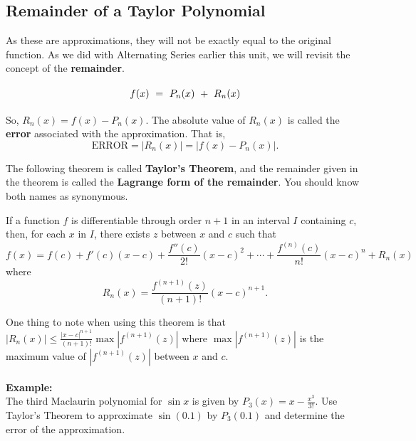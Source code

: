\subsection*{Remainder of a Taylor Polynomial}
As these are approximations, they will not be exactly equal to the original function. As we did with Alternating Series earlier this unit, we will revisit the concept of the \textbf{remainder}.

\begin{equation*}
    \tikzmark{exact}{f(x)} = \tikzmark{approx}{P_n(x)} + \tikzmark{remainder}{R_n(x)}
\end{equation*}

\vspace{.2in}

So, $\displaystyle R_n(x)=f(x)-P_n(x)$. The absolute value of $\displaystyle R_n(x)$ is called the \textbf{error} associated with the approximation. That is,
\[\text{ERROR}=|R_n(x)|=|f(x)-P_n(x)|.\]

The following theorem is called \textbf{Taylor's Theorem}, and the remainder given in the theorem is called the \textbf{Lagrange form of the remainder}. You should know both names as synonymous.

\begin{tcolorbox}[title= TAYLOR'S THEOREM,colframe=black,sharp corners,colback=white,colbacktitle=white,coltitle=black]

    If a function $f$ is differentiable through order $n+1$ in an interval $I$ containing $c$, then, for each $x$ in $I$, there exists $z$ between $x$ and $c$ such that
    \[f(x)=f(c)+f'(c)(x-c)+\frac{f''(c)}{2!}(x-c)^2+\cdots+\frac{f^{(n)}(c)}{n!}(x-c)^n+R_n(x)\]
    where
    \[R_n(x)=\frac{f^{(n+1)}(z)}{(n+1)!}(x-c)^{n+1}.\]
    
\end{tcolorbox}
\vspace{.1in}
One thing to note when using this theorem is that $\displaystyle \left|R_n(x)\right|\le\frac{|x-c|^{n+1}}{(n+1)!}\max\left|f^{(n+1)}(z)\right|$ where $\max\left|f^{(n+1)}(z)\right|$ is the maximum value of $\left|f^{(n+1)}(z)\right|$ between $x$ and $c$.\\
\\
\noindent\textbf{Example:}\\
The third Maclaurin polynomial for $\sin x$ is given by $\displaystyle P_3(x)=x-\frac{x^3}{3!}$. Use Taylor's Theorem to approximate $\sin(0.1)$ by $P_3(0.1)$ and determine the error of the approximation.


